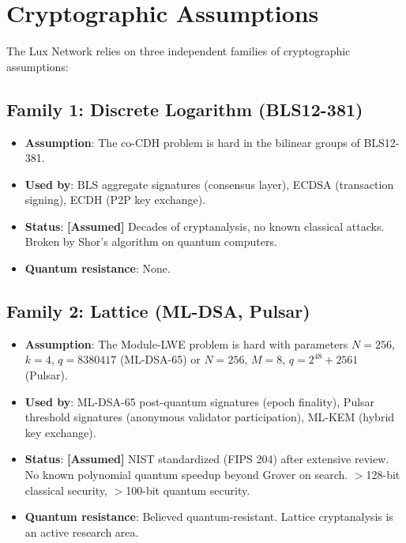 \section{Cryptographic Assumptions}

\label{sec:assumptions}

The Lux Network relies on three independent families of cryptographic assumptions:

\subsection{Family 1: Discrete Logarithm (BLS12-381)}

\begin{itemize}[leftmargin=2em]
  \item \textbf{Assumption}: The co-CDH problem is hard in the bilinear groups of
        BLS12-381.
  \item \textbf{Used by}: BLS aggregate signatures (consensus layer), ECDSA
        (transaction signing), ECDH (P2P key exchange).
  \item \textbf{Status}: \textbf{[Assumed]} Decades of cryptanalysis, no known
        classical attacks. Broken by Shor's algorithm on quantum computers.
  \item \textbf{Quantum resistance}: None.
\end{itemize}

\subsection{Family 2: Lattice (ML-DSA, Pulsar)}

\begin{itemize}[leftmargin=2em]
  \item \textbf{Assumption}: The Module-LWE problem is hard with parameters $N = 256$,
        $k = 4$, $q = 8380417$ (ML-DSA-65) or $N = 256$, $M = 8$,
        $q = 2^{48} + 2561$ (Pulsar).
  \item \textbf{Used by}: ML-DSA-65 post-quantum signatures (epoch finality),
        Pulsar threshold signatures (anonymous validator participation), ML-KEM
        (hybrid key exchange).
  \item \textbf{Status}: \textbf{[Assumed]} NIST standardized (FIPS 204) after
        extensive review. No known polynomial quantum speedup beyond Grover on
        search. $>$128-bit classical security, $>$100-bit quantum security.
  \item \textbf{Quantum resistance}: Believed quantum-resistant. Lattice
        cryptanalysis is an active research area.
\end{itemize}

